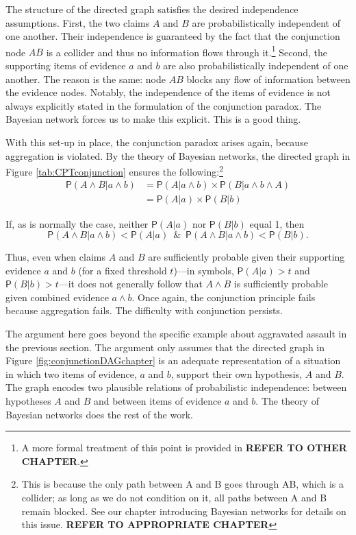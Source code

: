 \documentclass[
  10pt,
  dvipsnames,enabledeprecatedfontcommands]{scrartcl}
\newcommand{\et}{\wedge}
\newcommand{\pr}[1]{\ensuremath{\mathsf{P}(#1)}}
\begin{document}
The structure of the directed graph satisfies the desired independence
assumptions. First, the two claims \(A\) and \(B\) are probabilistically
independent of one another. Their independence is guaranteed by the fact
that the conjunction node \(AB\) is a collider and thus no information
flows through it.\footnote{A more formal treatment of this point is
  provided in \textbf{REFER TO OTHER CHAPTER}.} Second, the supporting
items of evidence \(a\) and \(b\) are also probabilistically independent
of one another. The reason is the same: node \(AB\) blocks any flow of
information between the evidence nodes. Notably, the independence of the
items of evidence is not always explicitly stated in the formulation of
the conjunction paradox. The Bayesian network forces us to make this
explicit. This is a good thing.

With this set-up in place, the conjunction paradox arises again, because
aggregation is violated. By the theory of Bayesian networks, the
directed graph in Figure \ref{tab:CPTconjunction} ensures the
following:\footnote{This is because the only path between \textsf{A} and
  \textsf{B} goes through \textsf{AB}, which is a collider; as long as
  we do not condition on it, all paths between \textsf{A} and \textsf{B}
  remain blocked. See our chapter introducing Bayesian networks for
  details on this issue. \textbf{REFER TO APPROPRIATE CHAPTER}}
\begin{align*}
\pr{A \wedge  B \vert a \wedge b}& =\pr{A \vert a \wedge b} \times \pr{B \vert  a \wedge b \wedge A}\\
 & = \pr{A \vert a} \times \pr{B \vert  b}
 \end{align*}

\noindent  If, as is normally the case, neither \(\pr{A \vert a}\) nor
\(\pr{B \vert b}\) equal 1, then
\[\pr{A \wedge B \vert a \wedge b}< \pr{A \vert a} \;\ \& \;\ \pr{A \wedge B \vert a \wedge b} < \pr{B \vert b}. \]

\noindent Thus, even when claims \(A\) and \(B\) are sufficiently
probable given their supporting evidence \(a\) and \(b\) (for a fixed
threshold \(t\))---in symbols, \(\pr{A \vert a}>t\) and
\(\pr{B \vert b}>t\)---it does not generally follow that \(A \et B\) is
sufficiently probable given combined evidence \(a\et b\). Once again,
the conjunction principle fails because aggregation fails. The
difficulty with conjunction persists.

The argument here goes beyond the specific example about aggravated
assault in the previous section. The argument only assumes that the
directed graph in Figure \ref{fig:conjunctionDAGchapter} is an adequate
representation of a situation in which two items of evidence, \(a\) and
\(b\), support their own hypothesis, \(A\) and \(B\). The graph encodes
two plausible relations of probabilistic independence: between
hypotheses \(A\) and \(B\) and between items of evidence \(a\) and
\(b\). The theory of Bayesian networks does the rest of the work.
\end{document}
